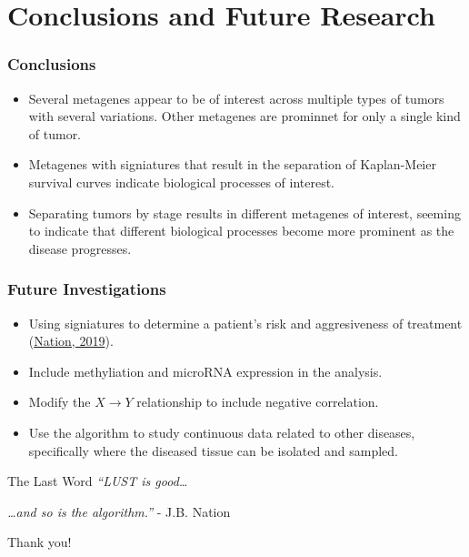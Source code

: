 \documentclass[
	11pt, %
]{beamer}
\begin{document}

\section{Conclusions and Future Research}

\begin{frame}
    \frametitle{Conclusions}
    \begin{itemize}
        \item Several metagenes appear to be of interest across multiple types of tumors with several variations. Other metagenes are prominnet for only a single kind of tumor.
        \pause
        \item Metagenes with signiatures that result in the separation of Kaplan-Meier survival curves indicate biological processes of interest.
        \pause
        \item Separating tumors by stage results in different metagenes of interest, seeming to indicate that different biological processes become more prominent as the disease progresses.
    \end{itemize}
\end{frame}

\begin{frame}
    \frametitle{Future Investigations}
    \begin{itemize}
        \item Using signiatures to determine a patient's risk and aggresiveness of treatment (\href{https://github.com/tristanh314/lust-cancer-2019/blob/master/papers/melanoma_signature_2.pdf}{Nation, 2019}).
        \pause
        \item Include methyliation and microRNA expression in the analysis.
        \pause
        \item Modify the $X \rightarrow Y$ relationship to include negative correlation.
        \pause
        \item Use the algorithm to study continuous data related to other diseases, specifically where the diseased tissue can be isolated and sampled.
    \end{itemize}
    \begin{block}{The Last Word}
        \emph{``LUST is good\ldots}
        \pause
        \smallskip

        \emph{\ldots and so is the algorithm.''} - J.B. Nation
    \end{block}
    \pause
    \begin{center}
        \large{Thank you!}
    \end{center}
\end{frame}
\end{document}
